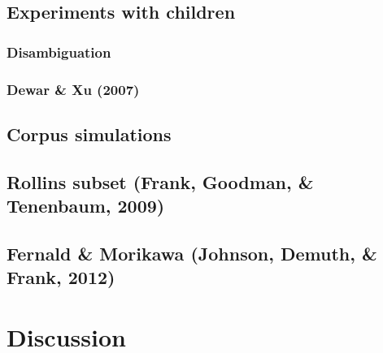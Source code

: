 \documentclass[man,noapacite]{apa2}
\begin{document}
\subsection{Experiments with children}

\subsubsection{Disambiguation}

\subsubsection{Dewar \& Xu (2007)}


\subsection{Corpus simulations}

\subsection{Rollins subset (Frank, Goodman, \& Tenenbaum, 2009)}

\subsection{Fernald \& Morikawa (Johnson, Demuth, \& Frank, 2012)}

\section{Discussion}

\newpage



\end{document}
